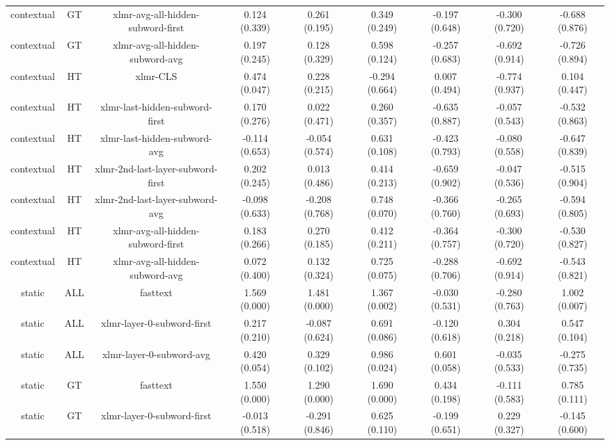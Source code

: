 \begin{sidewaystable}[htb]
\begin{tabular}{@{}ccccccccc@{}}
        contextual & GT & xlmr-avg-all-hidden-subword-first & 0.124 (0.339) & 0.261 (0.195) & 0.349 (0.249) & -0.197 (0.648) & -0.300 (0.720) & -0.688 (0.876) \\
        contextual & GT & xlmr-avg-all-hidden-subword-avg & 0.197 (0.245) & 0.128 (0.329) & 0.598 (0.124) & -0.257 (0.683) & -0.692 (0.914) & -0.726 (0.894) \\
        contextual & HT & xlmr-CLS & 0.474 (0.047) & 0.228 (0.215) & -0.294 (0.664) & 0.007 (0.494) & -0.774 (0.937) & 0.104 (0.447) \\
        contextual & HT & xlmr-last-hidden-subword-first & 0.170 (0.276) & 0.022 (0.471) & 0.260 (0.357) & -0.635 (0.887) & -0.057 (0.543) & -0.532 (0.863) \\
        contextual & HT & xlmr-last-hidden-subword-avg & -0.114 (0.653) & -0.054 (0.574) & 0.631 (0.108) & -0.423 (0.793) & -0.080 (0.558) & -0.647 (0.839) \\
        contextual & HT & xlmr-2nd-last-layer-subword-first & 0.202 (0.245) & 0.013 (0.486) & 0.414 (0.213) & -0.659 (0.902) & -0.047 (0.536) & -0.515 (0.904) \\
        contextual & HT & xlmr-2nd-last-layer-subword-avg & -0.098 (0.633) & -0.208 (0.768) & 0.748 (0.070) & -0.366 (0.760) & -0.265 (0.693) & -0.594 (0.805) \\
        contextual & HT & xlmr-avg-all-hidden-subword-first & 0.183 (0.266) & 0.270 (0.185) & 0.412 (0.211) & -0.364 (0.757) & -0.300 (0.720) & -0.530 (0.827) \\
        contextual & HT & xlmr-avg-all-hidden-subword-avg & 0.072 (0.400) & 0.132 (0.324) & 0.725 (0.075) & -0.288 (0.706) & -0.692 (0.914) & -0.543 (0.821) \\
        static & ALL & fasttext & 1.569 (0.000) & 1.481 (0.000) & 1.367 (0.002) & -0.030 (0.531) & -0.280 (0.763) & 1.002 (0.007) \\
        static & ALL & xlmr-layer-0-subword-first & 0.217 (0.210) & -0.087 (0.624) & 0.691 (0.086) & -0.120 (0.618) & 0.304 (0.218) & 0.547 (0.104) \\
        static & ALL & xlmr-layer-0-subword-avg & 0.420 (0.054) & 0.329 (0.102) & 0.986 (0.024) & 0.601 (0.058) & -0.035 (0.533) & -0.275 (0.735) \\
        static & GT & fasttext & 1.550 (0.000) & 1.290 (0.000) & 1.690 (0.000) & 0.434 (0.198) & -0.111 (0.583) & 0.785 (0.111) \\
        static & GT & xlmr-layer-0-subword-first & -0.013 (0.518) & -0.291 (0.846) & 0.625 (0.110) & -0.199 (0.651) & 0.229 (0.327) & -0.145 (0.600) \\

\end{tabular}
\end{sidewaystable}
